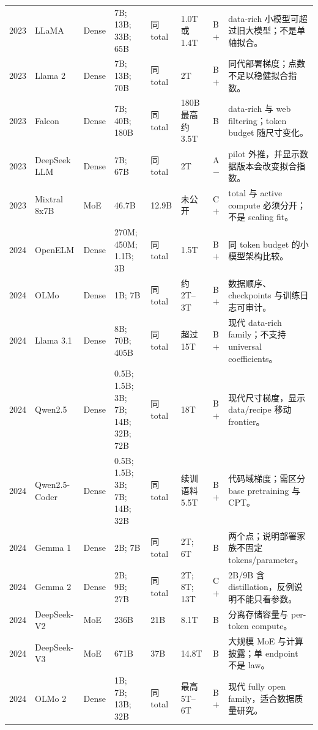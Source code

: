 \documentclass[UTF8,10pt,a4paper,fontset=none]{ctexart}
\begin{document}
\begin{longtable}{C{0.55cm}p{1.50cm}p{1.10cm}p{3.20cm}p{2.00cm}p{1.80cm}C{0.65cm}p{3.80cm}}
2023 & LLaMA\cite{zh:llama2023} & Dense & 7B; 13B; 33B; 65B & 同 total & 1.0T 或 1.4T & B$+$ & data-rich 小模型可超过旧大模型；不是单轴拟合。 \\
2023 & Llama 2\cite{zh:llama2} & Dense & 7B; 13B; 70B & 同 total & 2T & B$+$ & 同代部署梯度；点数不足以稳健拟合指数。 \\
2023 & Falcon\cite{zh:falcon2023} & Dense & 7B; 40B; 180B & 同 total & 180B 最高约 3.5T & B & data-rich 与 web filtering；token budget 随尺寸变化。 \\
2023 & DeepSeek LLM\cite{zh:deepseekllm2024} & Dense & 7B; 67B & 同 total & 2T & A$-$ & pilot 外推，并显示数据版本会改变拟合指数。 \\
2023 & Mixtral 8x7B\cite{zh:mixtral2024} & MoE & 46.7B & 12.9B & 未公开 & C$+$ & total 与 active compute 必须分开；不是 scaling fit。 \\
2024 & Open\allowbreak ELM\cite{zh:openelm2024} & Dense & 270M; 450M; 1.1B; 3B & 同 total & 1.5T & B$+$ & 同 token budget 的小模型架构比较。 \\
2024 & OLMo\cite{zh:olmo2024} & Dense & 1B; 7B & 同 total & 约 2T--3T & B$+$ & 数据顺序、checkpoints 与训练日志可审计。 \\
2024 & Llama 3.1\cite{zh:llama31} & Dense & 8B; 70B; 405B & 同 total & 超过 15T & B$+$ & 现代 data-rich family；不支持 universal coefficients。 \\
2024 & Qwen2.5\cite{zh:qwen25} & Dense & 0.5B; 1.5B; 3B; 7B; 14B; 32B; 72B & 同 total & 18T & B$+$ & 现代尺寸梯度，显示 data/recipe 移动 frontier。 \\
2024 & Qwen2.5-Coder\cite{zh:qwen25coder} & Dense & 0.5B; 1.5B; 3B; 7B; 14B; 32B & 同 total & 续训语料 5.5T & B$+$ & 代码域梯度；需区分 base pretraining 与 CPT。 \\
2024 & Gemma 1\cite{zh:gemma1} & Dense & 2B; 7B & 同 total & 2T; 6T & B & 两个点；说明部署家族不固定 tokens/parameter。 \\
2024 & Gemma 2\cite{zh:gemma2} & Dense & 2B; 9B; 27B & 同 total & 2T; 8T; 13T & C$+$ & 2B/9B 含 distillation，反例说明不能只看参数。 \\
2024 & DeepSeek-V2\cite{zh:deepseekv2} & MoE & 236B & 21B & 8.1T & B & 分离存储容量与 per-token compute。 \\
2024 & DeepSeek-V3\cite{zh:deepseekv3} & MoE & 671B & 37B & 14.8T & B & 大规模 MoE 与计算披露；单 endpoint 不是 law。 \\
2024 & OLMo 2\cite{zh:olmo2} & Dense & 1B; 7B; 13B; 32B & 同 total & 最高 5T--6T & B$+$ & 现代 fully open family，适合数据质量研究。 \\

\end{longtable}
\end{document}
